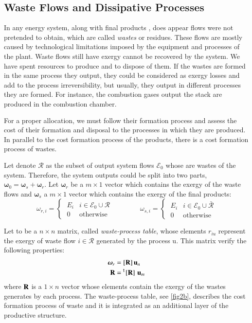 \documentclass{ecos}
\begin{document}
\subsection{Waste Flows and Dissipative Processes}
In any energy system, along with final products \cite{Agudelo12}, does appear flows were not pretended to obtain, which are called \emph{wastes} or residues.  These flows are mostly caused by technological limitations imposed by the equipment and processes of the plant.
Waste flows still have exergy cannot be recovered by the system. We have spent resources to produce and to dispose of them. If the wastes are formed in the same process they output, they could be considered as exergy losses and add to the process irreversibility, but usually, they output in different processes they are formed. For instance, the combustion gases output the stack are produced in the combustion chamber.

For a proper allocation, we must follow their formation process and assess the cost of their formation and disposal to the processes in which they are produced. In parallel to the cost formation process of the products, there is a cost formation process of wastes.

Let denote $\mathcal{R}$ as the subset of output system flows $\mathcal{E}_0$ whose are wastes of the system. Therefore, the system outputs could be split into two parts, $\bm{\omega}_0=\bm{\omega}_s+\bm{\omega}_r$.
Let $\bm{\omega}_r$ be a  $m \times 1$ vector which contains the exergy of the waste flows and $\bm{\omega}_s$ a $m \times 1$ vector which contains the exergy of the final products:
\begin{equation}
\omega_{r,i}=\begin{cases}
\;E_i&i\in \mathcal{E}_0\cup\mathcal{R} \\
\;0 & \text{otherwise}
\end{cases}
\qquad \qquad
\omega_{s,i}=\begin{cases}
	\;E_i&i\in \mathcal{E}_0\cup\bar{\mathcal{R}} \\
	\;0 & \text{otherwise}
\end{cases}
\end{equation}

Let  to be a $n \times n$ matrix, called \emph{waste-process table}, whose elements $r_{iu}$ represent the exergy of waste flow $i\in\mathcal{R}$ generated by the process u.
This matrix verify the following properties:
\begin{align}
\bm{\omega}_r &=[\mathbf{R}]\,\mathbf{u}_n \\
\mathbf{R} &=\prescript{\smash{\mathsf{t}}}{}{\mskip-1mu}\left[ \textbf{R} \right]\,\mathbf{u}_m
\end{align}
where $\mathbf{R}$ is a $1\times n$ vector whose elements contain the exergy of the wastes generates by each process. The waste-process table, see \cref{fig2b}, describes the cost formation process of waste and it is integrated as an additional layer of the productive structure.
\end{document}
